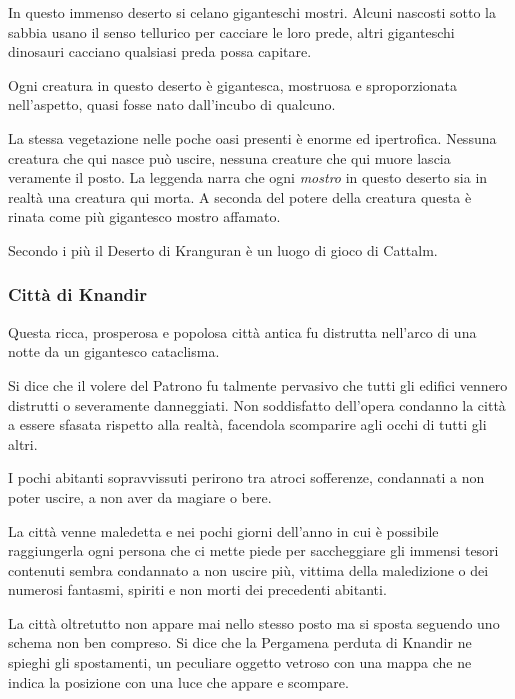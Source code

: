 \begin{multicols}{2}
In questo immenso deserto si celano giganteschi mostri. Alcuni nascosti sotto la sabbia usano il senso tellurico per cacciare le loro prede, altri giganteschi dinosauri cacciano qualsiasi preda possa capitare.

Ogni creatura in questo deserto è gigantesca, mostruosa e sproporzionata nell'aspetto, quasi fosse nato dall'incubo di qualcuno.

La stessa vegetazione nelle poche oasi presenti è enorme ed ipertrofica. Nessuna creatura che qui nasce può uscire, nessuna creature che qui muore lascia veramente il posto. La leggenda narra che ogni \emph{mostro} in questo deserto sia in realtà una creatura qui morta. A seconda del potere della creatura questa è rinata come più gigantesco mostro affamato.

Secondo i più il Deserto di Kranguran è un luogo di gioco di Cattalm.

\subsubsection{Città di Knandir}

Questa ricca, prosperosa e popolosa città antica fu distrutta nell'arco di una notte da un gigantesco cataclisma.

Si dice che il volere del Patrono fu talmente pervasivo che tutti gli edifici vennero distrutti o severamente danneggiati. Non soddisfatto dell'opera condanno la città a essere sfasata rispetto alla realtà, facendola scomparire agli occhi di tutti gli altri.

I pochi abitanti sopravvissuti perirono tra atroci sofferenze, condannati a non poter uscire, a non aver da magiare o bere.

La città venne maledetta e nei pochi giorni dell'anno in cui è possibile raggiungerla ogni persona che ci mette piede per saccheggiare gli immensi tesori contenuti sembra condannato a non uscire più, vittima della maledizione o dei numerosi fantasmi, spiriti e non morti dei precedenti abitanti.

La città oltretutto non appare mai nello stesso posto ma si sposta seguendo uno schema non ben compreso. Si dice che la Pergamena perduta di Knandir ne spieghi gli spostamenti, un peculiare oggetto vetroso con una mappa che ne indica la posizione con una luce che appare e scompare.



\end{multicols}
